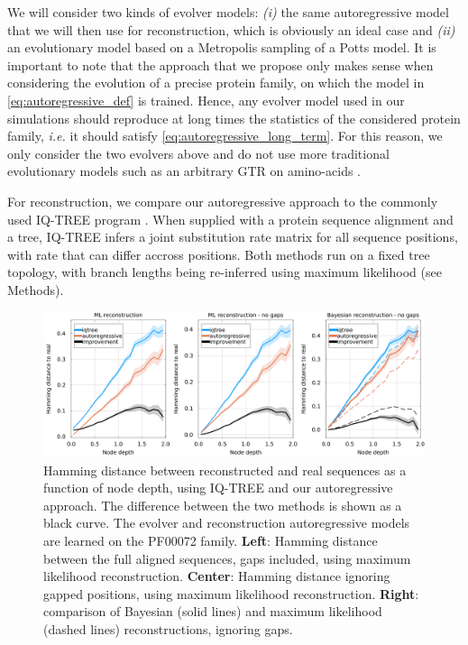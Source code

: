 We will consider two kinds of evolver models: \emph{(i)} the same autoregressive model that we will then use for reconstruction, which is obviously an ideal case and \emph{(ii)} an evolutionary model based on a Metropolis sampling of a Potts model. 
It is important to note that the approach that we propose only makes sense when considering the evolution of a precise protein family, on which the model in \eqref{eq:autoregressive_def} is trained. 
Hence, any evolver model used in our simulations should reproduce at long times the statistics of the considered protein family, \emph{i.e.} it should satisfy \eqref{eq:autoregressive_long_term}. 
For this reason, we only consider the two evolvers above and do not use more traditional evolutionary models such as an arbitrary GTR on amino-acids \cite{rambaut_seqgenapplicationmonte_1997}. 

For reconstruction, we compare our autoregressive approach to the commonly used IQ-TREE program  \cite{minh_iqtreenewmodels_2020}.
When supplied with a protein sequence alignment and a tree, IQ-TREE infers a joint substitution rate matrix for all sequence positions, with rate that can differ accross positions. 
Both methods run on a fixed tree topology, with branch lengths being re-inferred using maximum likelihood (see Methods). 

\begin{figure}
	\centering
	\includegraphics[width = \textwidth]{figures/hamming_to_real_arnet_PF00072.png}
	\caption{
		Hamming distance between reconstructed and real sequences as a function of node depth, using IQ-TREE and our autoregressive approach. 
		The difference between the two methods is shown as a black curve. 
		The evolver and reconstruction autoregressive models are learned on the PF00072 family. 
		\textbf{Left}: Hamming distance between the full aligned sequences, gaps included, using maximum likelihood reconstruction.  	
		\textbf{Center}: Hamming distance ignoring gapped positions, using maximum likelihood reconstruction. 
		\textbf{Right}: comparison of Bayesian (solid lines) and maximum likelihood (dashed lines) reconstructions, ignoring gaps. 
	}
	\label{fig:hamming_real_arnet}
\end{figure}

